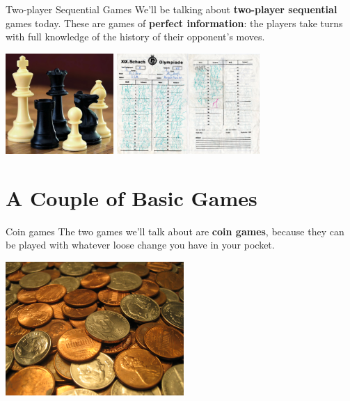 \documentclass{beamer}
\theoremstyle{theorem}
\theoremstyle{definition}
\newcommand{\<}{\langle}
\renewcommand{\>}{\rangle}
\newcommand{\term}[1]{\textbf{#1}}
\begin{document}
\begin{frame}{Two-player Sequential Games}
  We'll be talking about \term{two-player sequential} games today. These are
  games of \term{perfect information}: the players take turns with full
  knowledge of the history of their opponent's moves.

  \vspace{1em}


  \centerline{
    \includegraphics[height=1.5in]{chessPieces.jpg}
    \includegraphics[height=1.5in]{chessNotation.jpg}
  }
\end{frame}

\section{A Couple of Basic Games}

\begin{frame}{Coin games}
  The two games we'll talk about are \term{coin games}, because they can be
  played with whatever loose change you have in your pocket.

  \centerline{
    \includegraphics[height=2in]{coins.jpg}
  }
\end{frame}
\end{document}
